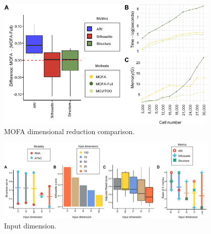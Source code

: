 \begin{figure}[!ht]
	\centering
	\includegraphics[width=0.95\textwidth]{MOFA/fig}
	\vspace{0.1cm}
	\caption[MOFA dimensional reduction comparison.]{MOFA dimensional reduction comparison.}
	\label{fig:MOFA}
\end{figure}


\begin{figure}[!ht]
	\centering
	\includegraphics[width=0.95\textwidth]{Input_Dimensions/fig}
	\vspace{0.1cm}
	\caption[Input dimensions affection]{Input dimension.}
	\label{fig:Input_Dimensions}
\end{figure}






